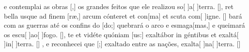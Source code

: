 {        { e contemplai as obras [,] os grandes feitos que ele realizou so[ ]{a}[ ]{ter}ra. [\LinkPT]},
    {ret bella usque ad finem [ræ,] arcum cónteret et con[ma] et scuta com[ ]{i}gne.
            [\LinkLA]}%
        {bará com as guerras até os confins do [do;] quebrará o arco e esmaga[mas,] e queimará os escu[ ]{ao}[ ]{fo}go. [\LinkPT]},
    {te et vidéte quóniam [us:] exaltábor in géntibus et exaltá[ ]{in}[ ]{ter}ra. [\LinkLA]}%
        {, e reconhecei que [;] exaltado entre as nações, exalta[ ]{na}[ ]{ter}ra. [\LinkPT]}
}